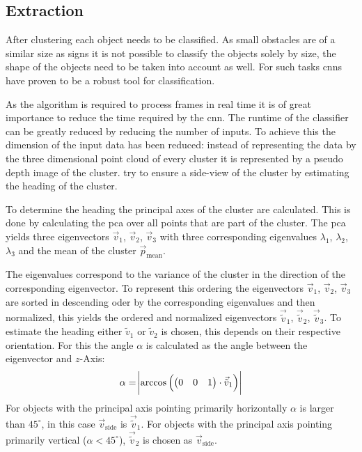 \subsection{Extraction} \label{sec:det:originalExtraction}
After clustering each object needs to be classified. 
As small obstacles are of a similar size as signs it is not possible to classify the objects solely by size, the shape of the objects need to be taken into account as well. 
For such tasks \ac{cnn}s have proven to be a robust tool for classification.

As the algorithm is required to process frames in real time it is of great importance to reduce the time required by the \ac{cnn}.
The runtime of the classifier can be greatly reduced by reducing the number of inputs.
To achieve this the dimension of the input data has been reduced: instead of representing the data by the three dimensional point cloud of every cluster it is represented by a pseudo depth image of the cluster. \cite{AttBen17} try to ensure a side-view of the cluster by estimating the heading of the cluster.

To determine the heading the principal axes of the cluster are calculated. 
This is done by calculating the \ac{pca} over all points that are part of the cluster.
The \ac{pca} yields three eigenvectors $\vec{v}_1$, $\vec{v}_2$, $\vec{v}_3$ with three corresponding eigenvalues $\lambda_1$, $\lambda_2$, $\lambda_3$ and the mean of the cluster $\vec{p}_\text{mean}$.

The eigenvalues correspond to the variance of the cluster in the direction of the corresponding eigenvector. 
To represent this ordering the eigenvectors $\vec{v}_1$, $\vec{v}_2$, $\vec{v}_3$ are sorted in descending oder by the corresponding eigenvalues and then normalized, this yields the ordered and normalized eigenvectors $\vec{\tilde{v}}_1$, $\vec{\tilde{v}}_2$, $\vec{\tilde{v}}_3$.
To estimate the heading either $\tilde{v}_1$ or $\tilde{v}_2$ is chosen, this depends on their respective orientation. For this the angle $\alpha$ is calculated as the angle between the eigenvector and $z$-Axis:
\begin{equation}
    \alpha = \abs{
        \arccos \left(
        \begin{pmatrix} 
            0 & 0 & 1
        \end{pmatrix}
        \cdot \vec{\tilde{v}}_1
    \right)}
\end{equation}
For objects with the principal axis pointing primarily horizontally $\alpha$ is larger than $45^\circ$, in this case $\vec{v}_\text{side}$ is $\vec{\tilde{v}}_1$. For objects with the principal axis pointing primarily vertical ($\alpha < 45^\circ$), $\vec{\tilde{v}}_2$ is chosen as $\vec{v}_\text{side}$.

